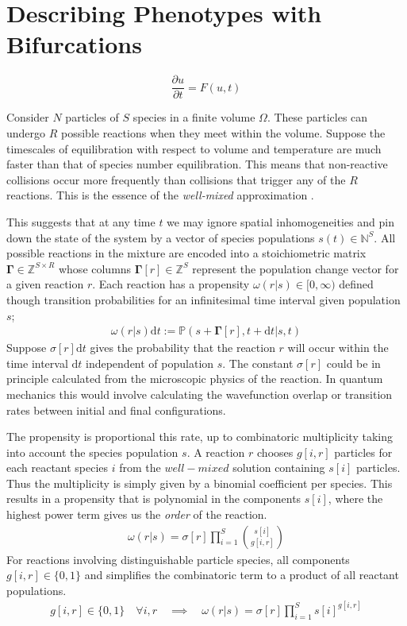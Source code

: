 \section{Describing Phenotypes with Bifurcations}

\begin{equation}
	\frac{\partial u}{\partial t} = F(u,t)
	\label{eq:odes}
\end{equation}

Consider $N$ particles of $S$ species in a finite volume $\Omega$. These particles
can undergo $R$ possible reactions when they meet within the volume. Suppose the
timescales of equilibration with respect to volume and temperature are much faster
than that of species number equilibration. This means that non-reactive collisions
occur more frequently than collisions that trigger any of the $R$ reactions. This
is the essence of the \textit{well-mixed} approximation \cite{Gillespie1992}.

This suggests that at any time $t$ we may ignore spatial inhomogeneities and pin
down the state of the system by a vector of species populations $s(t)\in\mathbb{N}^S$.
All possible reactions in the mixture are encoded into a stoichiometric matrix
$\mathbf{\Gamma}\in\mathbb{Z}^{S\times R}$ whose columns $\mathbf{\Gamma}[r]\in\mathbb{Z}^{S}$
represent the population change vector for a given reaction $r$. Each reaction
has a propensity $\omega(r|s)\in[0,\infty)$ defined though transition
probabilities for an infinitesimal time interval given population $s$;
\begin{align}
	\omega(r|s)\mathrm{d}t := \mathbb{P}(s+\mathbf{\Gamma}[r],t+\mathrm{d}t|s,t)
	\label{eq:fundamentalpremise}
\end{align}
Suppose $\sigma[r]\mathrm{d}t$ gives the probability that the reaction $r$
will occur within the time interval $\mathrm{d}t$ independent of population
$s$. The constant $\sigma[r]$ could be in principle calculated from the
microscopic physics of the reaction. In quantum mechanics this would involve
calculating the wavefunction overlap or transition rates between initial and
final configurations.

The propensity is proportional this rate, up to combinatoric multiplicity
taking into account the species population $s$. A reaction $r$ chooses $g[i,r]$
particles for each reactant species $i$ from the $well-mixed$ solution containing
$s[i]$ particles. Thus the multiplicity is simply given by a binomial coefficient
per species. This results in a propensity that is polynomial in the components
$s[i]$, where the highest power term gives us the \textit{order} of the reaction.
\begin{align}
	\omega(r|s)=
	\sigma[r]
		\prod_{i=1}^S{s[i] \choose g[i,r]}
	\label{eq:propensity}
\end{align}
For reactions involving distinguishable particle species, all
components $ g[i,r]\in\{ 0,1\}$ and simplifies the combinatoric term to a
product of all reactant populations.
\begin{align}
	g[i,r]\in\{ 0,1\}\quad\forall i,r\quad\implies\quad
	\omega(r|s)=
	\sigma[r]
	\prod_{i=1}^S s[i]^{g[i,r]}
	\label{eq:simplifiedpropensity}
\end{align}
